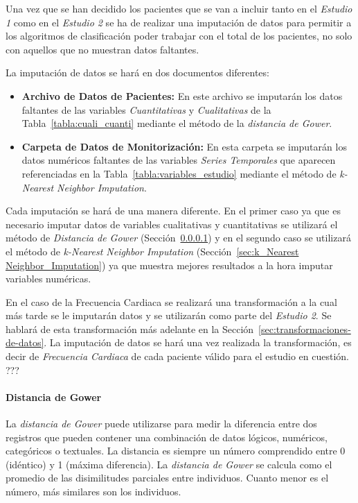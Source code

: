 Una vez que se han decidido los pacientes que se van a incluir tanto en el \textit{Estudio 1} como en el \textit{Estudio 2} se ha de realizar una imputación de datos para permitir a los algoritmos de clasificación poder trabajar con el total de los pacientes, no solo con aquellos que no muestran datos faltantes. 

La imputación de datos se hará en dos documentos diferentes:
\begin{itemize}
    \item \textbf{Archivo de Datos de Pacientes:} En este archivo se imputarán los datos faltantes de las variables \textit{Cuantitativas} y \textit{Cualitativas} de la Tabla~\ref{tabla:cuali_cuanti} mediante el método de la \textit{distancia de Gower}.
    \item \textbf{Carpeta de Datos de Monitorización:} En esta carpeta se imputarán los datos numéricos faltantes de las variables \textit{Series Temporales} que aparecen referenciadas en la Tabla~\ref{tabla:variables_estudio} mediante el método de \textit{k-Nearest Neighbor Imputation}.
\end{itemize}

Cada imputación se hará de una manera diferente. En el primer caso ya que es necesario imputar datos de variables cualitativas y cuantitativas se utilizará el método de \textit{Distancia de Gower} (Sección~\ref{sec:gower_distance}) y en el segundo caso se utilizará el método de \textit{k-Nearest Neighbor Imputation} (Sección~\ref{sec:k_Nearest Neighbor_Imputation}) ya que muestra mejores resultados a la hora imputar variables numéricas.

En el caso de la Frecuencia Cardiaca se realizará una transformación a la cual más tarde se le imputarán datos y se utilizarán como parte del \textit{Estudio 2}. Se hablará de esta transformación más adelante en la Sección~\ref{sec:transformaciones-de-datos}. La imputación de datos se hará una vez realizada la transformación, es decir de {\color{red} \textit{Frecuencia Cardiaca} de cada paciente válido para el estudio en cuestión.} {\color{blue} ???}

\paragraph{Distancia de Gower}\label{sec:gower_distance}

La \textit{distancia de Gower} puede utilizarse para medir la diferencia entre dos registros que pueden contener una combinación de datos lógicos, numéricos, categóricos o textuales. La distancia es siempre un número comprendido entre 0 (idéntico) y 1 (máxima diferencia). La \textit{distancia de Gower} se calcula como el promedio de las disimilitudes parciales entre individuos. Cuanto menor es el número, más similares son los individuos.

